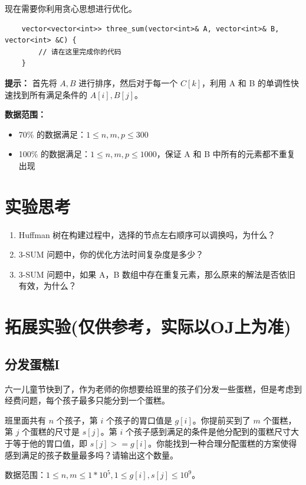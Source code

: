 \documentclass[12pt,a4paper]{article}
\begin{document}
现在需要你利用贪心思想进行优化。

\begin{lstlisting}
    vector<vector<int>> three_sum(vector<int>& A, vector<int>& B, vector<int> &C) {
        // 请在这里完成你的代码
    }
\end{lstlisting}

\textbf{提示：} 首先将 $A,B$ 进行排序，然后对于每一个 $C[k]$，利用 A 和 B 的单调性快速找到所有满足条件的 $A[i], B[j]$。


\textbf{数据范围：}
\begin{itemize}[noitemsep]
    \item 70\% 的数据满足：$1\le n, m, p \le 300$
    \item 100\% 的数据满足：$1\le n, m, p \le 1000$，保证 A 和 B 中所有的元素都不重复出现
\end{itemize}



\section{实验思考}

\begin{enumerate}
    \item Huffman 树在构建过程中，选择的节点左右顺序可以调换吗，为什么？
    \item 3-SUM 问题中，你的优化方法时间复杂度是多少？
    \item 3-SUM 问题中，如果 A，B 数组中存在重复元素，那么原来的解法是否依旧有效，为什么？
\end{enumerate}

\section{拓展实验(仅供参考，实际以OJ上为准)}

\subsection{分发蛋糕I}
六一儿童节快到了，作为老师的你想要给班里的孩子们分发一些蛋糕，但是考虑到经费问题，每个孩子最多只能分到一个蛋糕。

班里面共有 $n$ 个孩子，第 $i$ 个孩子的胃口值是 $g[i]$。你提前买到了 $m$ 个蛋糕，第 $j$ 个蛋糕的尺寸是 $s[j]$。第 $i$ 个孩子感到满足的条件是他分配到的蛋糕尺寸大于等于他的胃口值，即 $s[j] >= g[i]$。你能找到一种合理分配蛋糕的方案使得感到满足的孩子数量最多吗？请输出这个数量。

数据范围：$1\le n, m \le 1*10^5, 1\le g[i], s[j] \le 10^9$。
\end{document}

